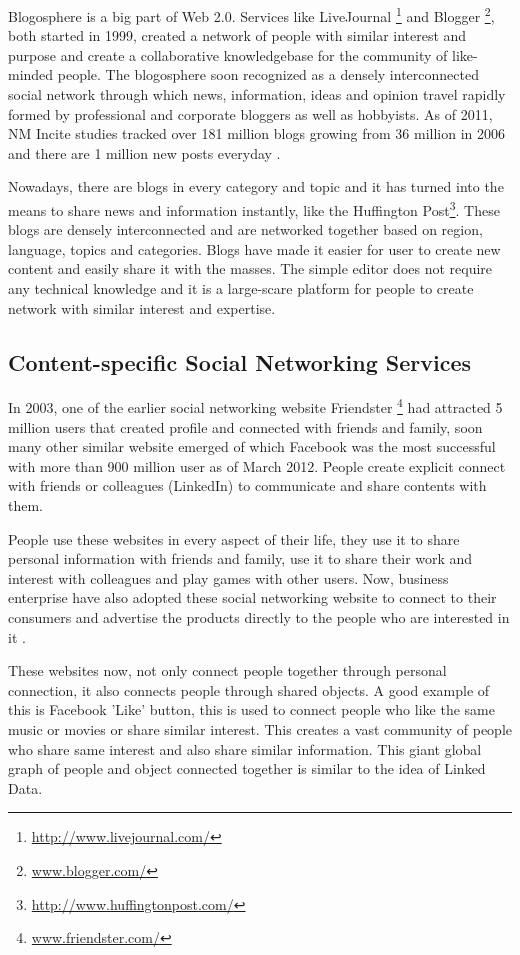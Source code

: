 Blogosphere is a big part of Web 2.0. Services like LiveJournal \footnote{\url{http://www.livejournal.com/}} and Blogger \footnote{\url{www.blogger.com/}}, both started in 1999, created a network of people with similar interest and purpose and create a collaborative knowledgebase for the community of like-minded people. The blogosphere soon recognized as a densely interconnected social network through which news, information, ideas and opinion travel rapidly formed by professional and corporate bloggers as well as hobbyists. As of 2011, NM Incite studies tracked over 181 million blogs growing from 36 million in 2006 and there are 1 million new posts everyday \cite{nm2011}.

Nowadays, there are blogs in every category and topic and it has turned into the means to share news and information instantly, like the Huffington Post\footnote{\url{http://www.huffingtonpost.com/}}. These blogs are densely interconnected and are networked together based on region, language, topics and categories. Blogs have made it easier for user to create new content and easily share it with the masses. The simple editor does not require any technical knowledge and it is a large-scare platform for people to create network with similar interest and expertise.


\subsection{Content-specific Social Networking Services}

In 2003, one of the earlier social networking website Friendster \footnote{\url{www.friendster.com/}} had attracted 5 million users that created profile and connected with friends and family, soon many other similar website emerged of which Facebook was the most successful with more than 900 million user as of March 2012. People create explicit connect with friends or colleagues (LinkedIn) to communicate and share contents with them.

People use these websites in every aspect of their life, they use it to share personal information with friends and family, use it to share their work and interest with colleagues and play games with other users. Now, business enterprise have also adopted these social networking website to connect to their consumers and advertise the products directly to the people who are interested in it \cite{ridings2004virtual}.

These websites now, not only connect people together through personal connection, it also connects people through shared objects. A good example of this is Facebook 'Like' button, this is used to connect people who like the same music or movies or share similar interest. This creates a vast community of people who share same interest and also share similar information. This giant global graph of people and object connected together is similar to the idea of Linked Data.


